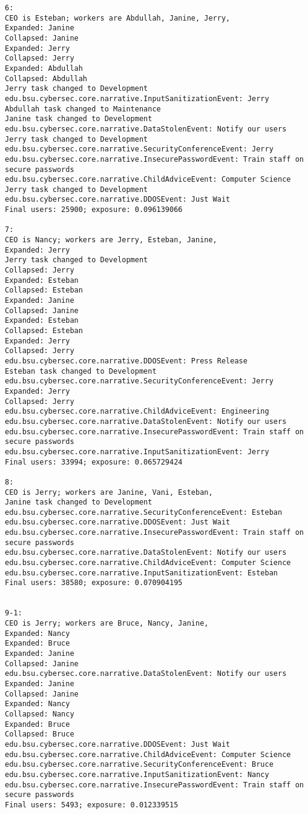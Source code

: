 \begin{verbatim}
6:
CEO is Esteban; workers are Abdullah, Janine, Jerry, 
Expanded: Janine
Collapsed: Janine
Expanded: Jerry
Collapsed: Jerry
Expanded: Abdullah
Collapsed: Abdullah
Jerry task changed to Development
edu.bsu.cybersec.core.narrative.InputSanitizationEvent: Jerry
Abdullah task changed to Maintenance
Janine task changed to Development
edu.bsu.cybersec.core.narrative.DataStolenEvent: Notify our users
Jerry task changed to Development
edu.bsu.cybersec.core.narrative.SecurityConferenceEvent: Jerry
edu.bsu.cybersec.core.narrative.InsecurePasswordEvent: Train staff on secure passwords
edu.bsu.cybersec.core.narrative.ChildAdviceEvent: Computer Science
Jerry task changed to Development
edu.bsu.cybersec.core.narrative.DDOSEvent: Just Wait
Final users: 25900; exposure: 0.096139066

7:
CEO is Nancy; workers are Jerry, Esteban, Janine, 
Expanded: Jerry
Jerry task changed to Development
Collapsed: Jerry
Expanded: Esteban
Collapsed: Esteban
Expanded: Janine
Collapsed: Janine
Expanded: Esteban
Collapsed: Esteban
Expanded: Jerry
Collapsed: Jerry
edu.bsu.cybersec.core.narrative.DDOSEvent: Press Release
Esteban task changed to Development
edu.bsu.cybersec.core.narrative.SecurityConferenceEvent: Jerry
Expanded: Jerry
Collapsed: Jerry
edu.bsu.cybersec.core.narrative.ChildAdviceEvent: Engineering
edu.bsu.cybersec.core.narrative.DataStolenEvent: Notify our users
edu.bsu.cybersec.core.narrative.InsecurePasswordEvent: Train staff on secure passwords
edu.bsu.cybersec.core.narrative.InputSanitizationEvent: Jerry
Final users: 33994; exposure: 0.065729424

8:
CEO is Jerry; workers are Janine, Vani, Esteban, 
Janine task changed to Development
edu.bsu.cybersec.core.narrative.SecurityConferenceEvent: Esteban
edu.bsu.cybersec.core.narrative.DDOSEvent: Just Wait
edu.bsu.cybersec.core.narrative.InsecurePasswordEvent: Train staff on secure passwords
edu.bsu.cybersec.core.narrative.DataStolenEvent: Notify our users
edu.bsu.cybersec.core.narrative.ChildAdviceEvent: Computer Science
edu.bsu.cybersec.core.narrative.InputSanitizationEvent: Esteban
Final users: 38580; exposure: 0.070904195


9-1:
CEO is Jerry; workers are Bruce, Nancy, Janine, 
Expanded: Nancy
Expanded: Bruce
Expanded: Janine
Collapsed: Janine
edu.bsu.cybersec.core.narrative.DataStolenEvent: Notify our users
Expanded: Janine
Collapsed: Janine
Expanded: Nancy
Collapsed: Nancy
Expanded: Bruce
Collapsed: Bruce
edu.bsu.cybersec.core.narrative.DDOSEvent: Just Wait
edu.bsu.cybersec.core.narrative.ChildAdviceEvent: Computer Science
edu.bsu.cybersec.core.narrative.SecurityConferenceEvent: Bruce
edu.bsu.cybersec.core.narrative.InputSanitizationEvent: Nancy
edu.bsu.cybersec.core.narrative.InsecurePasswordEvent: Train staff on secure passwords
Final users: 5493; exposure: 0.012339515


\end{verbatim}
